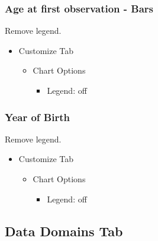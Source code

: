\documentclass[
]{book}
\providecommand{\tightlist}{%
  \setlength{\itemsep}{0pt}\setlength{\parskip}{0pt}}
\begin{document}
\hypertarget{age-at-first-observation---bars-1}{%
\subsubsection*{Age at first observation - Bars}\label{age-at-first-observation---bars-1}}

Remove legend.

\begin{itemize}
\tightlist
\item
  Customize Tab

  \begin{itemize}
  \tightlist
  \item
    Chart Options

    \begin{itemize}
    \tightlist
    \item
      Legend: off
    \end{itemize}
  \end{itemize}
\end{itemize}

\hypertarget{year-of-birth-1}{%
\subsubsection*{Year of Birth}\label{year-of-birth-1}}

Remove legend.

\begin{itemize}
\tightlist
\item
  Customize Tab

  \begin{itemize}
  \tightlist
  \item
    Chart Options

    \begin{itemize}
    \tightlist
    \item
      Legend: off
    \end{itemize}
  \end{itemize}
\end{itemize}

\hypertarget{data-domains-tab-1}{%
\subsection*{Data Domains Tab}\label{data-domains-tab-1}}
\end{document}
